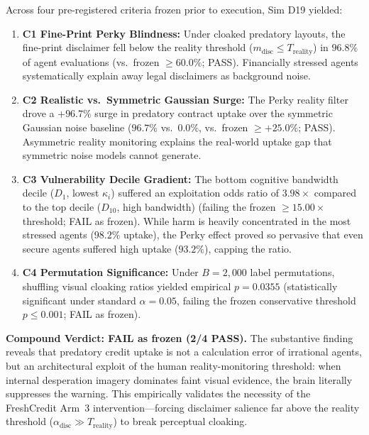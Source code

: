 \documentclass[11pt,twocolumn]{article}
\theoremstyle{plain}
\begin{document}
Across four pre-registered criteria frozen prior to execution, Sim D19 yielded:
\begin{enumerate}
\item \textbf{C1 Fine-Print Perky Blindness:} Under cloaked predatory layouts, the fine-print disclaimer fell below the reality threshold ($m_{\text{disc}} \le T_{\text{reality}}$) in $96.8\%$ of agent evaluations (vs.\ frozen $\ge 60.0\%$; PASS). Financially stressed agents systematically explain away legal disclaimers as background noise.
\item \textbf{C2 Realistic vs.\ Symmetric Gaussian Surge:} The Perky reality filter drove a $+96.7\%$ surge in predatory contract uptake over the symmetric Gaussian noise baseline ($96.7\%$ vs.\ $0.0\%$, vs.\ frozen $\ge +25.0\%$; PASS). Asymmetric reality monitoring explains the real-world uptake gap that symmetric noise models cannot generate.
\item \textbf{C3 Vulnerability Decile Gradient:} The bottom cognitive bandwidth decile ($D_1$, lowest $\kappa_i$) suffered an exploitation odds ratio of $3.98\times$ compared to the top decile ($D_{10}$, high bandwidth) (failing the frozen $\ge 15.00\times$ threshold; FAIL as frozen). While harm is heavily concentrated in the most stressed agents ($98.2\%$ uptake), the Perky effect proved so pervasive that even secure agents suffered high uptake ($93.2\%$), capping the ratio.
\item \textbf{C4 Permutation Significance:} Under $B = 2{,}000$ label permutations, shuffling visual cloaking ratios yielded empirical $p = 0.0355$ (statistically significant under standard $\alpha = 0.05$, failing the frozen conservative threshold $p \le 0.001$; FAIL as frozen).
\end{enumerate}

\textbf{Compound Verdict: FAIL as frozen (2/4 PASS).} The substantive finding reveals that predatory credit uptake is not a calculation error of irrational agents, but an architectural exploit of the human reality-monitoring threshold: when internal desperation imagery dominates faint visual evidence, the brain literally suppresses the warning. This empirically validates the necessity of the FreshCredit Arm~3 intervention---forcing disclaimer salience far above the reality threshold ($\alpha_{\text{disc}} \gg T_{\text{reality}}$) to break perceptual cloaking.
\end{document}
